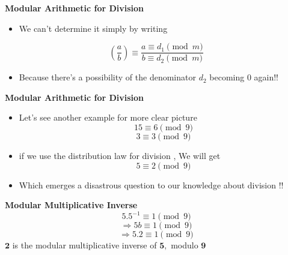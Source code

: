 \documentclass{beamer}
\begin{document}
\begin{frame}{\textbf{Modular Arithmetic for Division}}
    \begin{center}
        \begin{itemize}
            \item <1-> We can't determine it simply by writing
    \end{itemize} 
       \begin{block}{}
           $$ (\frac{a}{b}) \equiv \frac{a \equiv d_1 \pmod m}{b \equiv d_2 \pmod m} $$
       \end{block} 
        \begin{itemize}
            \item <2-> 
                Because there's a possibility of the denominator $ d_2 $ becoming 0 again!!
        \end{itemize} 
    \end{center}  
    \newline
    \newline
\end{frame}

\begin{frame}{\textbf{Modular Arithmetic for Division}}
    \begin{itemize}
        \item <1->Let's see another example for more clear picture 
        \newline 
        \begin{equation}
            15 \equiv 6 \pmod 9 
        \end{equation}
        \begin{equation}
            3 \equiv 3 \pmod 9
        \end{equation}
        
        \item <2->if we use the distribution law for division , We will get $$ 5 \equiv 2 \pmod 9 $$
        \newline
        \item <3->Which emerges a disastrous question to our knowledge about division !!
    \end{itemize}
    \newline
\end{frame}
\begin{frame}{\textbf{Modular Multiplicative Inverse}} 
     {$$5 . 5^{-1} \equiv 1 \pmod 9$$}
    \newline
     {$$\Rightarrow 5b \equiv 1\pmod 9 $$}
    \newline
     {$$\Rightarrow 5.2 \equiv 1\pmod 9 $$}
    \newline
     {$\textbf{2}$ is the modular multiplicative inverse of $\textbf{5},$ modulo $\textbf{9}$}
    \begin{center}
    \end{center}
\end{frame}
\end{document}
